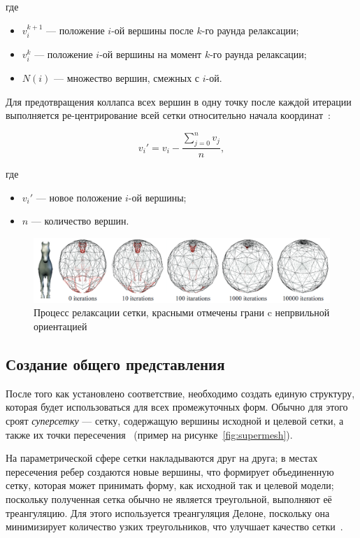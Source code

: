 где
\begin{itemize}
    \item $v_i^{k + 1}$ --- положение $i$-ой вершины после $k$-го раунда релаксации;
    \item $v_i^{k}$ --- положение $i$-ой вершины на момент $k$-го раунда релаксации;
    \item $N(i)$ --- множество вершин, смежных с $i$-ой.
\end{itemize}

Для предотвращения коллапса всех вершин в одну точку после каждой итерации выполняется ре-центрирование всей сетки относительно начала координат~\cite{alexa}:

\begin{equation}
    v_i' = v_i - \frac{\sum_{j = 0}^{n} v_j}{n},
\end{equation}

где
\begin{itemize}
    \item $v_i'$ --- новое положение $i$-ой вершины;
    \item $n$ --- количество вершин.
\end{itemize}

\begin{figure}[H]
    \centering
    \includegraphics[width=\textwidth]{../inc/images/relaxation}
    \caption{Процесс релаксации сетки, красными отмечены грани c непрвильной ориентацией}
    \label{fig:relaxation}
\end{figure}

\subsection{Создание общего представления}
После того как установлено соответствие, необходимо создать единую структуру, которая будет использоваться для всех промежуточных форм. Обычно для этого сроят \textit{суперсетку} --- сетку, содержащую вершины исходной и целевой сетки, а также их точки пересечения~\cite{mocanu,alexa} (пример на рисунке~\ref{fig:supermesh}).

На параметрической сфере сетки накладываются друг на друга; в местах пересечения ребер создаются новые вершины, что формирует объединенную сетку, которая может принимать форму, как исходной так и целевой модели; поскольку полученная сетка обычно не является треугольной, выполняют её треангуляцию. Для этого используется треангуляция Делоне, поскольку она минимизирует количество узких треугольников, что улучшает качество сетки~\cite{mocanu,alexa}.

